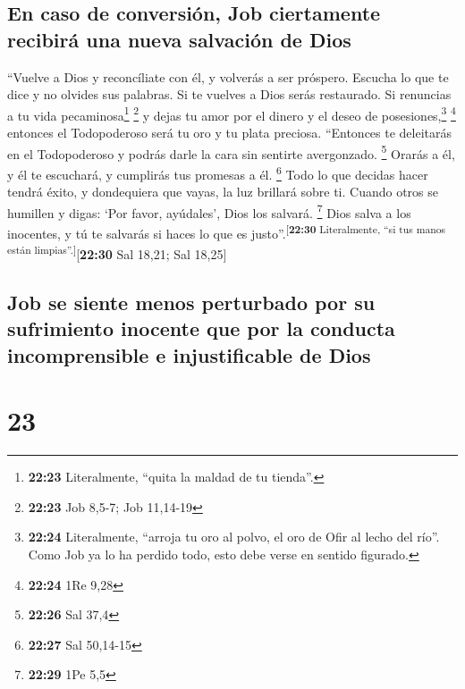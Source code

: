 \hypertarget{en-caso-de-conversiuxf3n-job-ciertamente-recibiruxe1-una-nueva-salvaciuxf3n-de-dios}{%
\subsection{En caso de conversión, Job ciertamente recibirá una nueva
salvación de
Dios}\label{en-caso-de-conversiuxf3n-job-ciertamente-recibiruxe1-una-nueva-salvaciuxf3n-de-dios}}

 ``Vuelve a Dios y reconcíliate con él, y volverás a ser
próspero.  Escucha lo que te dice y no olvides sus
palabras.  Si te vuelves a Dios serás restaurado. Si
renuncias a tu vida pecaminosa\footnote{\textbf{22:23} Literalmente,
  ``quita la maldad de tu tienda''.} \footnote{\textbf{22:23} Job 8,5-7;
  Job 11,14-19}  y dejas tu amor por el dinero y el deseo
de posesiones,\footnote{\textbf{22:24} Literalmente, ``arroja tu oro al
  polvo, el oro de Ofir al lecho del río''. Como Job ya lo ha perdido
  todo, esto debe verse en sentido figurado.} \footnote{\textbf{22:24}
  1Re 9,28}  entonces el Todopoderoso será tu oro y tu
plata preciosa.  ``Entonces te deleitarás en el
Todopoderoso y podrás darle la cara sin sentirte avergonzado.
\footnote{\textbf{22:26} Sal 37,4}  Orarás a él, y él te
escuchará, y cumplirás tus promesas a él. \footnote{\textbf{22:27} Sal
  50,14-15}  Todo lo que decidas hacer tendrá éxito, y
dondequiera que vayas, la luz brillará sobre ti.  Cuando
otros se humillen y digas: `Por favor, ayúdales', Dios los salvará.
\footnote{\textbf{22:29} 1Pe 5,5}  Dios salva a los
inocentes, y tú te salvarás si haces lo que es
justo''.\textsuperscript{{[}\textbf{22:30} Literalmente, ``si tus manos
están limpias''.{]}}{[}\textbf{22:30} Sal 18,21; Sal 18,25{]}

\hypertarget{job-se-siente-menos-perturbado-por-su-sufrimiento-inocente-que-por-la-conducta-incomprensible-e-injustificable-de-dios}{%
\subsection{Job se siente menos perturbado por su sufrimiento inocente
que por la conducta incomprensible e injustificable de
Dios}\label{job-se-siente-menos-perturbado-por-su-sufrimiento-inocente-que-por-la-conducta-incomprensible-e-injustificable-de-dios}}

\hypertarget{section-22}{%
\section{23}\label{section-22}}

